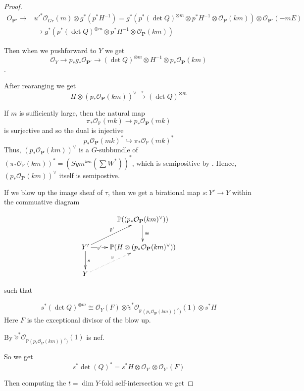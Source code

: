 \begin{proof}
\begin{align*}
{O}_{\mathbf{P}'}\to & u'^*\mathcal{O}_{Gr}(m)\otimes g^*(p^*H^{-1})=g^*(p^*(\det Q)^{\otimes m}\otimes p^*H^{-1}\otimes \mathcal{O}_{\mathbf{P}}(km))\otimes \mathcal{O}_{\mathbf{P}'}(-mE)\\&\to g^*(p^*(\det Q)^{\otimes m}\otimes p^*H^{-1}\otimes \mathcal{O}_{\mathbf{P}}(km))
\end{align*} 

Then when we pushforward to $Y$ we get $$\mathcal{O}_Y\to p_*g_*\mathcal{O}_{\mathbf{P}'}\to (\det Q)^{\otimes m}\otimes H^{-1}\otimes p_*\mathcal{O}_{\mathbf{P}}(km)$$ .

After rearanging we get $$H\otimes (p_*\mathcal{O}_{\mathbf{P}}(km))^{\vee}\stackrel{\tau}\to (\det Q)^{\otimes m}$$ 

If $m$ is sufficiently large, then the natural map $$\pi_*\mathcal{O}_{\mathbb{P}}(mk)\to p_*\mathcal{O}_{\mathbf{P}}(mk)$$ is surjective and so the dual is injective $$p_*\mathcal{O}_{\mathbf{P}}(mk)^*\hookrightarrow \pi_*\mathcal{O}_{\mathbb{P}}(mk)^*$$ Thus, $(p_*\mathcal{O}_{\mathbf{P}}(km))^{\vee}$ is a $G$-subbundle  of $(\pi_*\mathcal{O}_{\mathbb{P}}(km))^*=(Sym^{km}(\sum W^*))^*$, which is semipositive by . Hence, $(p_*\mathcal{O}_{\mathbf{P}}(km))^{\vee}$  itself is semipostive. 

If we blow up the image sheaf of $\tau$, then we get a birational map $s:Y'\to Y$ within the commuative diagram
 
$$\xymatrix{
&\mathbb{P}((p_*\mathcal{O}_{\mathbf{P}}(km)^{\vee})) \ar[d]^{\cong}\\
Y'  \ar[r]|-{v'} \ar[ru]^{\tilde{v}'} \ar[d]^s &\mathbb{P}(H\otimes (p_*\mathcal{O}_{\mathbf{P}}(km)^{\vee})) \\
Y \ar@{.>}[ru]^v &
}$$ 

such that 

$$s^*(\det Q)^{\otimes m}\cong \mathcal{O}_Y(F)\otimes \tilde{v}^*\mathcal{O}_{\mathbb{P}(p_*\mathcal{O}_{\mathbf{P}}(km))^{\vee})}(1)\otimes s^*H$$  Here $F$ is the exceptional divisor of the blow up.

By  $\tilde{v}^*\mathcal{O}_{\mathbb{P}(p_*\mathcal{O}_{\mathbf{P}}(km))^{\vee})}(1)$ is nef. 
  
So we get   
$$s^*\det(Q)^*=s^*H\otimes \mathcal{O}_{Y'}\otimes \mathcal{O}_{Y'}(F)$$   

Then computing the $t=\dim Y$-fold self-intersection we get 


\end{proof}
